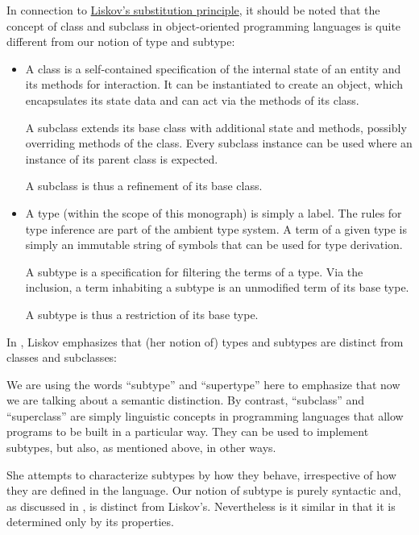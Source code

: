 \begin{remark}\label{rem:types_and_classes}
  In connection to \hyperref[con:liskov_substitution_principle]{Liskov's substitution principle}, it should be noted that the concept of class and subclass in object-oriented programming languages is quite different from our notion of type and subtype:
  \begin{itemize}
    \item A class is a self-contained specification of the internal state of an entity and its methods for interaction. It can be instantiated to create an object, which encapsulates its state data and can act via the methods of its class.

    A subclass extends its base class with additional state and methods, possibly overriding methods of the class. Every subclass instance can be used where an instance of its parent class is expected.

    A subclass is thus a refinement of its base class.

    \item A type (within the scope of this monograph) is simply a label. The rules for type inference are part of the ambient type system. A term of a given type is simply an immutable string of symbols that can be used for type derivation.

    A subtype is a specification for filtering the terms of a type. Via the inclusion, a term inhabiting a subtype is an unmodified term of its base type.

    A subtype is thus a restriction of its base type.
  \end{itemize}

  In \cite[25]{Liskov1987DataAbstractionAndHierarchy}, Liskov emphasizes that (her notion of) types and subtypes are distinct from classes and subclasses:
  \begin{displayquote}
    We are using the words \enquote{subtype} and \enquote{supertype} here to emphasize that now we are talking about a semantic distinction. By contrast, \enquote{subclass} and \enquote{superclass} are simply linguistic concepts in programming languages that allow programs to be built in a particular way. They can be used to implement subtypes, but also, as mentioned above, in other ways.
  \end{displayquote}

  She attempts to characterize subtypes by how they behave, irrespective of how they are defined in the language. Our notion of subtype is purely syntactic and, as discussed in , is distinct from Liskov's. Nevertheless is it similar in that it is determined only by its properties.
\end{remark}

